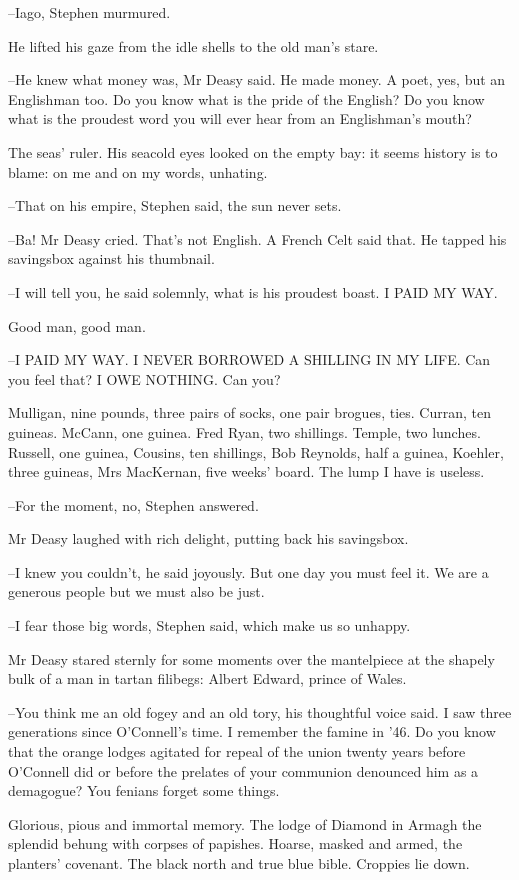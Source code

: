 --Iago, Stephen murmured.

He lifted his gaze from the idle shells to the old man's stare.

--He knew what money was, Mr Deasy said. He made money. A poet, yes,
but an Englishman too. Do you know what is the pride of the English? Do
you know what is the proudest word you will ever hear from an
Englishman's mouth?

The seas' ruler. His seacold eyes looked on the empty bay: it seems
history is to blame: on me and on my words, unhating.

--That on his empire, Stephen said, the sun never sets.

--Ba! Mr Deasy cried. That's not English. A French Celt said that. He
tapped his savingsbox against his thumbnail.

--I will tell you, he said solemnly, what is his proudest boast. I PAID
MY WAY.

Good man, good man.

--I PAID MY WAY. I NEVER BORROWED A SHILLING IN MY LIFE. Can you feel
that? I OWE NOTHING. Can you?

Mulligan, nine pounds, three pairs of socks, one pair brogues, ties.
Curran, ten guineas. McCann, one guinea. Fred Ryan, two shillings.
Temple, two lunches. Russell, one guinea, Cousins, ten shillings, Bob
Reynolds, half a guinea, Koehler, three guineas, Mrs MacKernan, five
weeks' board. The lump I have is useless.

--For the moment, no, Stephen answered.

Mr Deasy laughed with rich delight, putting back his savingsbox.

--I knew you couldn't, he said joyously. But one day you must feel it. We
are a generous people but we must also be just.

--I fear those big words, Stephen said, which make us so unhappy.

Mr Deasy stared sternly for some moments over the mantelpiece at
the shapely bulk of a man in tartan filibegs: Albert Edward, prince of
Wales.

--You think me an old fogey and an old tory, his thoughtful voice said. I
saw three generations since O'Connell's time. I remember the famine
in '46. Do you know that the orange lodges agitated for repeal of the
union twenty years before O'Connell did or before the prelates of your
communion denounced him as a demagogue? You fenians forget some things.

Glorious, pious and immortal memory. The lodge of Diamond in
Armagh the splendid behung with corpses of papishes. Hoarse, masked and
armed, the planters' covenant. The black north and true blue bible.
Croppies lie down.

